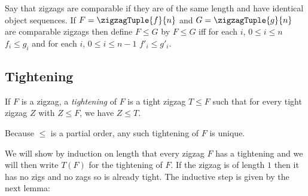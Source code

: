 Say that zigzags are comparable if they are of the same length
and have identical object sequences.
If $F=\zigzagTuple{f}{n}$ and 
$G=\zigzagTuple{g}{n}$
 are comparable zigzags then define $F \leq G$
by $F \leq G$ iff for each $i$, $0 \leq i \leq n$
$f_i \leq g_i$ and for each $i$, $0 \leq i \leq n-1$ $f'_i \leq g'_i$.

\subsection{Tightening}

\newcommand{\tightlead}
  {f_1,f'_1,...f_{n-2},f'_{n-1},
       f_{n-1} \circ 
       \rng{
                \rst{f_n} \circ f'_{n-1}
                     }
}   

If $F$ is a zigzag, a \textit{tightening} of $F$ is a tight zigzag
$T \leq F$ such that for every tight zigzag $Z$ with $Z \leq F$,
we have $Z \leq T$.

Because $\leq$ is a partial order, any such tightening of $F$ is unique.

We will show by induction on length that every zigzag $F$ has a tightening and we will then write $T(F)$ for the tightening of $F$.
If the zigzag is of length $1$ then it has no zigs and no zags so is already tight. The inductive step is given by the next lemma: 

